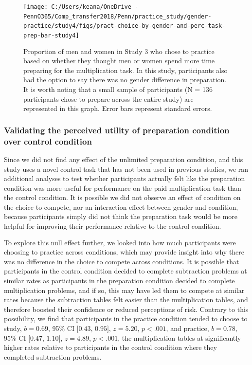 \documentclass[a4paper, nobind]{templates/ociamthesis}
\begin{document}
\begin{figure}

{\centering \texttt{[image: C:/Users/keana/OneDrive - PennO365/Comp\_transfer2018/Penn/practice\_study/gender-practice/study4/figs/pract-choice-by-gender-and-perc-task-prep-bar-study4]} 

}

\caption{Proportion of men and women in Study 3 who chose to practice based on whether they thought men or women spend more time preparing for the multiplication task. In this study, participants also had the option to say there was no gender difference in preparation. It is worth noting that a small sample of participants (N = 136 participants chose to prepare across the entire study) are represented in this graph. Error bars represent standard errors.}\label{fig:pract-choice-by-gender-and-perc-task-prep-bar-study4}
\end{figure}

\hypertarget{validating-the-perceived-utility-of-preparation-condition-over-control-condition}{%
\subsubsection{Validating the perceived utility of preparation condition over control condition}\label{validating-the-perceived-utility-of-preparation-condition-over-control-condition}}

Since we did not find any effect of the unlimited preparation condition, and this study uses a novel control task that has not been used in previous studies, we ran additional analyses to test whether participants actually felt like the preparation condition was more useful for performance on the paid multiplication task than the control condition. It is possible we did not observe an effect of condition on the choice to compete, nor an interaction effect between gender and condition, because participants simply did not think the preparation task would be more helpful for improving their performance relative to the control condition.

To explore this null effect further, we looked into how much participants were choosing to practice across conditions, which may provide insight into why there was no difference in the choice to compete across conditions. It is possible that participants in the control condition decided to complete subtraction problems at similar rates as participants in the preparation condition decided to complete multiplication problems, and if so, this may have led them to compete at similar rates because the subtraction tables felt easier than the multiplication tables, and therefore boosted their confidence or reduced perceptions of risk. Contrary to this possibility, we find that participants in the practice condition tended to choose to study, \(b = 0.69\), 95\% CI \([0.43\), \(0.95]\), \(z = 5.20\), \(p < .001\), and practice, \(b = 0.78\), 95\% CI \([0.47\), \(1.10]\), \(z = 4.89\), \(p < .001\), the multiplication tables at significantly higher rates relative to participants in the control condition where they completed subtraction problems.
\end{document}
